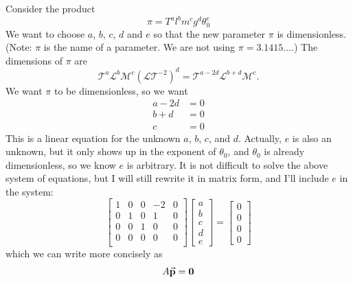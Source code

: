 Consider the product
\begin{equation}
   \pi = T^a l^b m^c g^d \theta_0^e
\end{equation}
We want to choose $a$, $b$, $c$, $d$ and $e$ so that
the new parameter $\pi$ is dimensionless.
(Note: $\pi$ is the name of a parameter.
We are not using $\pi = 3.1415\ldots$.)
The dimensions of $\pi$ are
\begin{equation}
  \mathcal{T}^a \mathcal{L}^b \mathcal{M}^c
     \left(\mathcal{LT}^{-2}\right)^d
     = \mathcal{T}^{a-2d}\mathcal{L}^{b+d}\mathcal{M}^c.
\end{equation}
We want $\pi$ to be dimensionless, so we want
\begin{equation}
\begin{split}
  a-2d & = 0 \\
  {b+d} & = 0 \\
  c  & = 0
\end{split}
\end{equation}
This is a linear equation for the unknown $a$, $b$, $c$, and
$d$. Actually, $e$ is also an unknown, but it only shows
up in the exponent of $\theta_0$, and $\theta_0$ is 
already dimensionless, so we know $e$ is arbitrary.
It is not difficult to solve the above system of
equations, but I will still rewrite it in matrix form, and
I'll include $e$ in the system:
\begin{equation}
   \begin{bmatrix}
       1 & 0 & 0 & -2 & 0 \\
       0 & 1 & 0 & 1  & 0 \\
       0 & 0 & 1 & 0  & 0 \\
       0 & 0 & 0 & 0 & 0  \\
   \end{bmatrix}
   \begin{bmatrix}
       a \\ b \\ c \\ d \\ e
   \end{bmatrix}
   =
   \begin{bmatrix}
       0 \\ 0 \\ 0 \\ 0
   \end{bmatrix}
   \label{eqn:linear_sys_for_nondim_params}
\end{equation}
which we can write more concisely as
\begin{equation}
   A \vec{\textbf{p}} = \mathbf{0}
\end{equation}
